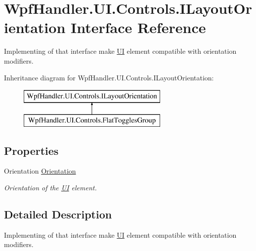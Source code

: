 \hypertarget{interface_wpf_handler_1_1_u_i_1_1_controls_1_1_i_layout_orientation}{}\section{Wpf\+Handler.\+U\+I.\+Controls.\+I\+Layout\+Orientation Interface Reference}
\label{interface_wpf_handler_1_1_u_i_1_1_controls_1_1_i_layout_orientation}


Implementing of that interface make \mbox{\hyperlink{namespace_wpf_handler_1_1_u_i}{UI}} element compatible with orientation modifiers.  


Inheritance diagram for Wpf\+Handler.\+U\+I.\+Controls.\+I\+Layout\+Orientation\+:\begin{figure}[H]
\begin{center}
\leavevmode
\includegraphics[height=2.000000cm]{d2/d03/interface_wpf_handler_1_1_u_i_1_1_controls_1_1_i_layout_orientation}
\end{center}
\end{figure}
\subsection*{Properties}
\begin{DoxyCompactItemize}
\item 
Orientation \mbox{\hyperlink{interface_wpf_handler_1_1_u_i_1_1_controls_1_1_i_layout_orientation_ae6ef94c906753022926767578498721a}{Orientation}}
\begin{DoxyCompactList}\small\item\em Orientation of the \mbox{\hyperlink{namespace_wpf_handler_1_1_u_i}{UI}} element. \end{DoxyCompactList}\end{DoxyCompactItemize}


\subsection{Detailed Description}
Implementing of that interface make \mbox{\hyperlink{namespace_wpf_handler_1_1_u_i}{UI}} element compatible with orientation modifiers. 



